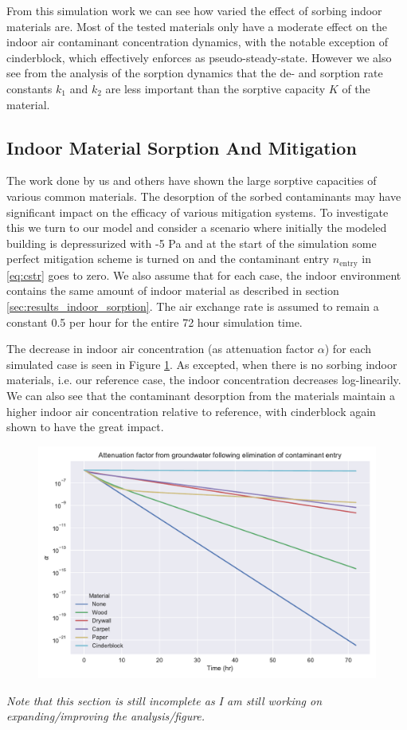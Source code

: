 From this simulation work we can see how varied the effect of sorbing indoor materials are.
Most of the tested materials only have a moderate effect on the indoor air contaminant concentration dynamics, with the notable exception of cinderblock, which effectively enforces as pseudo-steady-state.
However we also see from the analysis of the sorption dynamics that the de- and sorption rate constants $k_1$ and $k_2$ are less important than the sorptive capacity $K$ of the material.\par

\subsection{Indoor Material Sorption And Mitigation}\label{sec:results_indoor_mitigation}

The work done by us and others have shown the large sorptive capacities of various common materials.
The desorption of the sorbed contaminants may have significant impact on the efficacy of various mitigation systems.
To investigate this we turn to our model and consider a scenario where initially the modeled building is depressurized with -5 Pa and at the start of the simulation some perfect mitigation scheme is  turned on and the contaminant entry $n_\mathrm{entry}$ in \eqref{eq:cstr} goes to zero.
We also assume that for each case, the indoor environment contains the same amount of indoor material as described in section \ref{sec:results_indoor_sorption}.
The air exchange rate is assumed to remain a constant 0.5 per hour for the entire 72 hour simulation time.\par %

The decrease in indoor air concentration (as attenuation factor $\alpha$) for each simulated case is seen in Figure \ref{fig:sorption_mitigation}.
As excepted, when there is no sorbing indoor materials, i.e. our reference case, the indoor concentration decreases log-linearily.
We can also see that the contaminant desorption from the materials maintain a higher indoor air concentration relative to reference, with cinderblock again shown to have the great impact.\par

\begin{figure}[!htb]
  \includegraphics[width=\textwidth]{sorption_mitigation.pdf}
  \caption{}
  \label{fig:sorption_mitigation}
\end{figure}

\textit{Note that this section is still incomplete as I am still working on expanding/improving the analysis/figure.}
